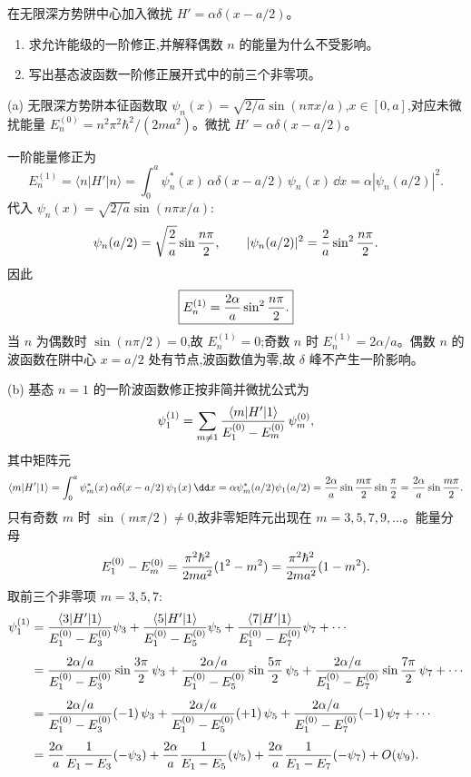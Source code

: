 \begin{question}
在无限深方势阱中心加入微扰 $H'=\alpha\delta(x-a/2)$。
\begin{enumerate}
\item 求允许能级的一阶修正,并解释偶数 $n$ 的能量为什么不受影响。
\item 写出基态波函数一阶修正展开式中的前三个非零项。
\end{enumerate}
\begin{solution}
(a) 无限深方势阱本征函数取 $\psi_n(x)=\sqrt{2/a}\sin(n\pi x/a)$,$x\in[0,a]$,对应未微扰能量 $E_n^{(0)}=n^2\pi^2\hbar^2/(2ma^2)$。微扰 $H'=\alpha\delta(x-a/2)$。

一阶能量修正为
\[
E_n^{(1)}=\langle n|H'|n\rangle=\int_0^a \psi_n^*(x)\,\alpha\delta(x-a/2)\,\psi_n(x)\,\dd x
=\alpha|\psi_n(a/2)|^2.
\]
代入 $\psi_n(x)=\sqrt{2/a}\sin(n\pi x/a)$:
\[
\psi_n(a/2)=\sqrt{2\over a}\sin{n\pi\over2},\qquad
|\psi_n(a/2)|^2={2\over a}\sin^2{n\pi\over2}.
\]
因此
\[
\boxed{E_n^{(1)}={2\alpha\over a}\sin^2{n\pi\over2}.}
\]
当 $n$ 为偶数时 $\sin(n\pi/2)=0$,故 $E_n^{(1)}=0$;奇数 $n$ 时 $E_n^{(1)}=2\alpha/a$。偶数 $n$ 的波函数在阱中心 $x=a/2$ 处有节点,波函数值为零,故 $\delta$ 峰不产生一阶影响。

(b) 基态 $n=1$ 的一阶波函数修正按非简并微扰公式为
\[
\psi_1^{(1)}=\sum_{m\ne1}{\langle m|H'|1\rangle\over E_1^{(0)}-E_m^{(0)}}\,\psi_m^{(0)},
\]
其中矩阵元
\[
\langle m|H'|1\rangle=\int_0^a\psi_m^*(x)\,\alpha\delta(x-a/2)\,\psi_1(x)\,\dd x
=\alpha\psi_m^*(a/2)\psi_1(a/2)
={2\alpha\over a}\sin{m\pi\over2}\sin{\pi\over2}
={2\alpha\over a}\sin{m\pi\over2}.
\]
只有奇数 $m$ 时 $\sin(m\pi/2)\ne0$,故非零矩阵元出现在 $m=3,5,7,9,\dots$。能量分母
\[
E_1^{(0)}-E_m^{(0)}={\pi^2\hbar^2\over2ma^2}(1^2-m^2)
={\pi^2\hbar^2\over2ma^2}(1-m^2).
\]
取前三个非零项 $m=3,5,7$:
\[
\begin{aligned}
\psi_1^{(1)}&=
{\langle3|H'|1\rangle\over E_1^{(0)}-E_3^{(0)}}\psi_3
+{\langle5|H'|1\rangle\over E_1^{(0)}-E_5^{(0)}}\psi_5
+{\langle7|H'|1\rangle\over E_1^{(0)}-E_7^{(0)}}\psi_7+\cdots\\[4pt]
&={2\alpha/a\over E_1^{(0)}-E_3^{(0)}}\sin{3\pi\over2}\,\psi_3
+{2\alpha/a\over E_1^{(0)}-E_5^{(0)}}\sin{5\pi\over2}\,\psi_5
+{2\alpha/a\over E_1^{(0)}-E_7^{(0)}}\sin{7\pi\over2}\,\psi_7+\cdots\\[4pt]
&={2\alpha/a\over E_1^{(0)}-E_3^{(0)}}(-1)\,\psi_3
+{2\alpha/a\over E_1^{(0)}-E_5^{(0)}}(+1)\,\psi_5
+{2\alpha/a\over E_1^{(0)}-E_7^{(0)}}(-1)\,\psi_7+\cdots\\[4pt]
&={2\alpha\over a}{1\over E_1-E_3}(-\psi_3)
+{2\alpha\over a}{1\over E_1-E_5}(\psi_5)
+{2\alpha\over a}{1\over E_1-E_7}(-\psi_7)+O(\psi_9).
\end{aligned}
\]
\end{solution}
\end{question}

